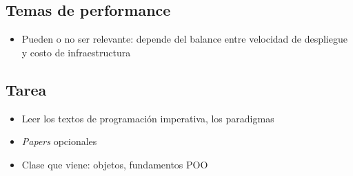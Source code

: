 \subsection{Temas de performance}
\begin{itemize}
    \item Pueden o no ser relevante: 
    depende del balance entre velocidad de despliegue y costo de infraestructura
\end{itemize}

\subsection{Tarea}
\begin{itemize}
    \item Leer los textos de programación imperativa, los paradigmas
    \item \textit{Papers} opcionales
    \item Clase que viene: objetos, fundamentos POO 
\end{itemize}
